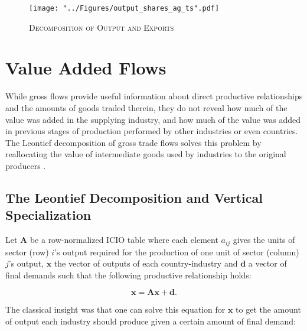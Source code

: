 \documentclass[a4paper]{article}
\begin{document}

\begin{figure}[h!]
\centering
\caption{\label{fig:outshares_ag_ts}\textsc{Decomposition of Output and Exports}}
\texttt{[image: "../Figures/output\_shares\_ag\_ts".pdf]} %
\end{figure}
\FloatBarrier


\section{Value Added Flows}
While gross flows provide useful information about direct productive relationships and the amounts of goods traded therein, they do not reveal how much of the value was added in the supplying industry, and how much of the value was added in previous stages of production performed by other industries or even countries. %
The Leontief decomposition of gross trade flows solves this problem by reallocating the value of intermediate goods used by industries to the original producers \citep{Kummritz2014}. %


\subsection{The Leontief Decomposition and Vertical Specialization}

Let $\textbf{A}$ be a row-normalized ICIO table where each element $a_{ij}$ gives the units of sector (row) $i$'s output required for the production of one unit of sector (column) $j$'s output, $\textbf{x}$ the vector of outputs of each country-industry and $\textbf{d}$ a vector of final demands such that the following productive relationship holds:

\begin{equation}
\textbf{x} = \textbf{A}\textbf{x} + \textbf{d}.
\end{equation}

The classical \citet{leontief1936quantitative} insight was that one can solve this equation for $\textbf{x}$ to get the amount of output each industry should produce given a certain amount of final demand:
\end{document}
